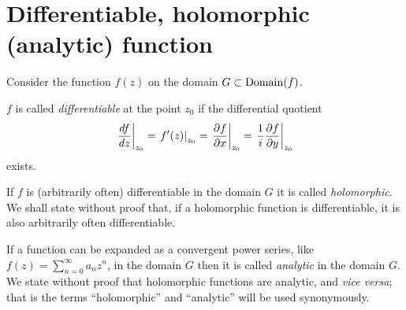 {\eexample
}



\section{Differentiable, holomorphic (analytic) function}

Consider the function $f(z)$ on the domain $G\subset {\rm Domain}(f)$.

$f$
is called {\em differentiable} at the point $z_0$ if the  differential quotient
\begin{equation}
\left. {df\over dz}\right|_{z_0}=
\left. f'(z)\right|_{z_0} =
\left. {\partial f\over \partial  x}\right|_{z_0} =
\left. {1\over i}{\partial f\over \partial y}\right|_{z_0}
\end{equation}
 exists.



If $f$ is (arbitrarily often) differentiable in the  domain $G$ it is called {\em holomorphic.}
We shall state without proof that, if a holomorphic function is differentiable, it is also arbitrarily often differentiable.

If a function  can be expanded as a convergent power series, like $f (z) = \sum_{n=0}^\infty a_n z^n$, in the  domain $G$ then it is called
{\em analytic} in the domain $G$.
We state without proof that holomorphic functions are analytic, and {\it vice versa};
that is the terms ``holomorphic'' and ``analytic'' will be used synonymously.




